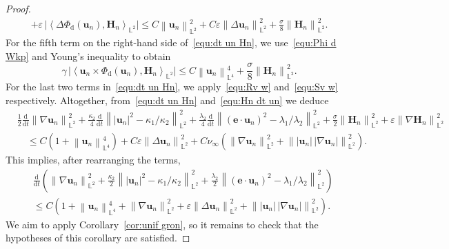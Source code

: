 \documentclass[11pt, reqno]{amsart}
\theoremstyle{definition}
\numberwithin{equation}{section}
\newcommand{\bff}{\boldsymbol}
\newcommand{\bb}{\mathbb}
\newcommand{\ddt}{\frac{\mathrm{d}}{\mathrm{d}t}}
\newcommand{\norm}[2]{\left\|{#1}\right\|_{#2}}
\newcommand{\inpro}[2]{\left\langle#1,#2\right\rangle}
\begin{document}
\begin{proof}
\begin{align*}
        +
        \varepsilon\,\Big|\inpro{\Delta \Phi_{\mathrm{d}}(\bff{u}_n)}{\bff{H}_n}_{\bb{L}^2} \Big|
        \leq
        C \norm{\bff{u}_n}{\bb{L}^2}^2
        +
        C\varepsilon \norm{\Delta \bff{u}_n}{\bb{L}^2}^2 
        +
        \frac{\sigma}{8} \norm{\bff{H}_n}{\bb{L}^2}^2.
    \end{align*}
    For the fifth term on the right-hand side of~\eqref{equ:dt un Hn}, we use~\eqref{equ:Phi d Wkp} and Young's inequality to obtain
    \[
        \gamma\, \Big|\inpro{\bff{u}_n\times \Phi_{\mathrm{d}}(\bff{u}_n)}{\bff{H}_n}_{\bb{L}^2} \Big| 
        \leq
        C \norm{\bff{u}_n}{\bb{L}^4}^4 + \frac{\sigma}{8} \norm{\bff{H}_n}{\bb{L}^2}^2.
    \]
	For the last two terms in~\eqref{equ:dt un Hn}, we apply~\eqref{equ:Rv w} and~\eqref{equ:Sv w} respectively. Altogether, from~\eqref{equ:dt un Hn} and~\eqref{equ:Hn dt un} we deduce
	\begin{align}\label{equ:ddt nab un ene}
		&\frac{1}{2} \ddt \norm{\nabla \bff{u}_n}{\bb{L}^2}^2
		+
		\frac{\kappa_2}{4} \ddt \norm{ |\bff{u}_n|^2 - \kappa_1/\kappa_2}{\bb{L}^2}^2
        +
        \frac{\lambda_2}{4} \ddt \norm{(\bff{e}\cdot \bff{u}_n)^2- \lambda_1/\lambda_2}{\bb{L}^2}^2
		+
		\frac{\sigma}{2} \norm{\bff{H}_n}{\bb{L}^2}^2
		+
		\varepsilon \norm{\nabla \bff{H}_n}{\bb{L}^2}^2
		\nonumber\\
		&\quad
        \leq
        C \left(1+ \norm{\bff{u}_n}{\bb{L}^4}^4 \right)
        +
        C\varepsilon \norm{\Delta \bff{u}_n}{\bb{L}^2}^2
        +
		C \nu_\infty
		\left( \norm{\nabla \bff{u}_n}{\bb{L}^2}^2
		+
		\norm{|\bff{u}_n|\, |\nabla \bff{u}_n|}{\bb{L}^2}^2 \right).
	\end{align}
This implies, after rearranging the terms,
\begin{align}\label{equ:ddt nab un etc}
    &\ddt \left( \norm{\nabla\bff{u}_n}{\bb{L}^2}^2
    +
		\frac{\kappa_2}{2} \norm{ |\bff{u}_n|^2 - \kappa_1/\kappa_2}{\bb{L}^2}^2
        +
        \frac{\lambda_2}{2} \norm{(\bff{e}\cdot \bff{u}_n)^2- \lambda_1/\lambda_2}{\bb{L}^2}^2 \right)
        \nonumber\\
&\leq
C \left(1+ \norm{\bff{u}_n}{\bb{L}^4}^4 
        +
        \norm{\nabla \bff{u}_n}{\bb{L}^2}^2
        +
        \varepsilon \norm{\Delta \bff{u}_n}{\bb{L}^2}^2
        +
		\norm{|\bff{u}_n|\, |\nabla \bff{u}_n|}{\bb{L}^2}^2 \right).
\end{align}
We aim to apply Corollary~\ref{cor:unif gron}, so it remains to check that the hypotheses of this corollary are satisfied.

\end{proof}
\end{document}
